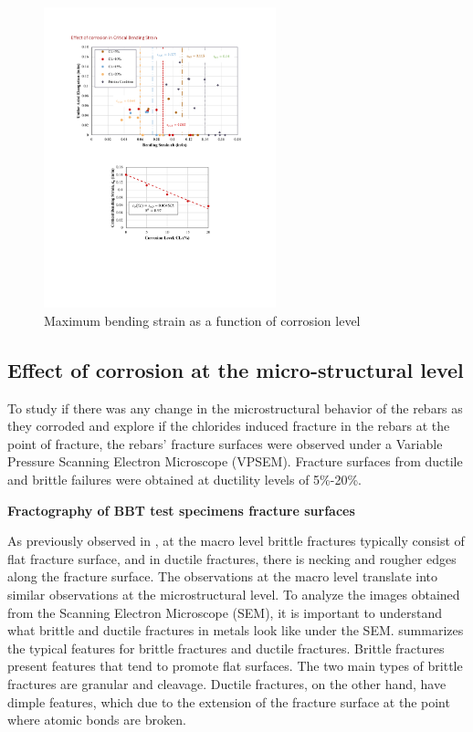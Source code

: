 \begin{figure}[htbp]
	\centering
	\includegraphics[width=0.6\textwidth]{VAC Thesis 2.0/Chapter-4/figs/BBT_results_summary.pdf}
	\caption{Maximum bending strain as a function of corrosion level}
	\label{fig:eb_vs_CL}
\end{figure}

\subsection{Effect of corrosion at the micro-structural level}

To study if there was any change in the microstructural behavior of the rebars as they corroded and explore if the chlorides induced fracture in the rebars at the point of fracture, the rebars' fracture surfaces were observed under a Variable Pressure Scanning Electron Microscope (VPSEM). Fracture surfaces from ductile and brittle failures were obtained at ductility levels of 5\%-20\%.

\textbf{Fractography of BBT test specimens fracture surfaces}

 As previously observed in , at the macro level brittle fractures typically consist of flat fracture surface, and in ductile fractures, there is necking and rougher edges along the fracture surface. The observations at the macro level translate into similar observations at the microstructural level. To analyze the images obtained from the Scanning Electron Microscope (SEM), it is important to understand what brittle and ductile fractures in metals look like under the SEM.  summarizes the typical features for brittle fractures and ductile fractures. Brittle fractures present features that tend to promote flat surfaces. The two main types of brittle fractures are granular and cleavage. Ductile fractures, on the other hand, have dimple features, which due to the extension of the fracture surface at the point where atomic bonds are broken.
 
